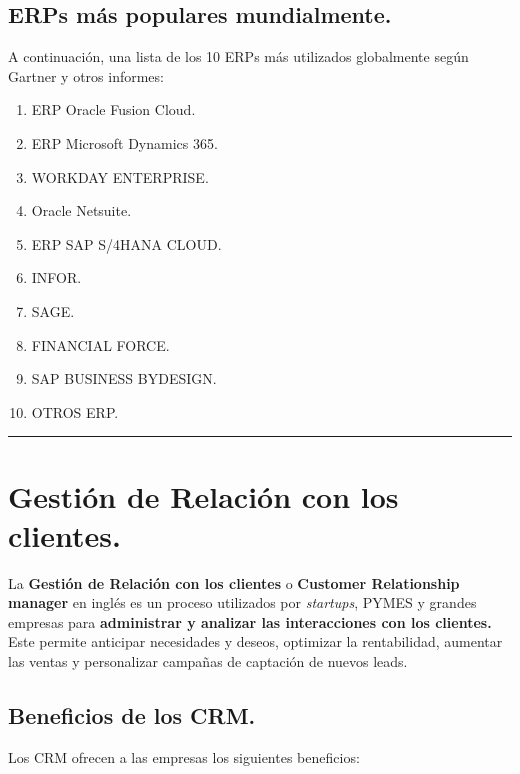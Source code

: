 \documentclass[
]{article}
\providecommand{\tightlist}{%
  \setlength{\itemsep}{0pt}\setlength{\parskip}{0pt}}
\begin{document}
\hypertarget{erps-muxe1s-populares-mundialmente.}{%
\subsection{ERPs más populares
mundialmente.}\label{erps-muxe1s-populares-mundialmente.}}

A continuación, una lista de los 10 ERPs más utilizados globalmente
según Gartner y otros informes:

\begin{enumerate}
\tightlist
\item
  ERP Oracle Fusion Cloud.
\item
  ERP Microsoft Dynamics 365.
\item
  WORKDAY ENTERPRISE.
\item
  Oracle Netsuite.
\item
  ERP SAP S/4HANA CLOUD.
\item
  INFOR.
\item
  SAGE.
\item
  FINANCIAL FORCE.
\item
  SAP BUSINESS BYDESIGN.
\item
  OTROS ERP.
\end{enumerate}

\begin{center}\rule{0.5\linewidth}{0.5pt}\end{center}

\hypertarget{gestiuxf3n-de-relaciuxf3n-con-los-clientes.}{%
\section{Gestión de Relación con los
clientes.}\label{gestiuxf3n-de-relaciuxf3n-con-los-clientes.}}

La \textbf{Gestión de Relación con los clientes} o \textbf{Customer
Relationship manager} en inglés es un proceso utilizados por
\emph{startups}, PYMES y grandes empresas para \textbf{administrar y
analizar las interacciones con los clientes.} Este permite anticipar
necesidades y deseos, optimizar la rentabilidad, aumentar las ventas y
personalizar campañas de captación de nuevos leads.

\hypertarget{beneficios-de-los-crm.}{%
\subsection{Beneficios de los CRM.}\label{beneficios-de-los-crm.}}

Los CRM ofrecen a las empresas los siguientes beneficios:
\end{document}
